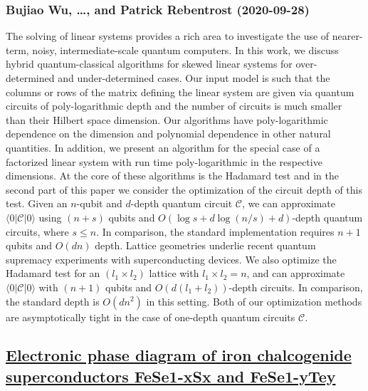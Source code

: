 \subsubsection*{Bujiao Wu, \dots, and Patrick Rebentrost (2020-09-28)}
The solving of linear systems provides a rich area to investigate the use of
nearer-term, noisy, intermediate-scale quantum computers. In this work, we
discuss hybrid quantum-classical algorithms for skewed linear systems for
over-determined and under-determined cases. Our input model is such that the
columns or rows of the matrix defining the linear system are given via quantum
circuits of poly-logarithmic depth and the number of circuits is much smaller
than their Hilbert space dimension. Our algorithms have poly-logarithmic
dependence on the dimension and polynomial dependence in other natural
quantities. In addition, we present an algorithm for the special case of a
factorized linear system with run time poly-logarithmic in the respective
dimensions. At the core of these algorithms is the Hadamard test and in the
second part of this paper we consider the optimization of the circuit depth of
this test. Given an $n$-qubit and $d$-depth quantum circuit $\mathcal{C}$, we
can approximate $\langle 0|\mathcal{C}|0\rangle$ using $(n + s)$ qubits and
$O\left(\log s + d\log (n/s) + d\right)$-depth quantum circuits, where $s\leq
n$. In comparison, the standard implementation requires $n+1$ qubits and
$O(dn)$ depth. Lattice geometries underlie recent quantum supremacy experiments
with superconducting devices. We also optimize the Hadamard test for an
$(l_1\times l_2)$ lattice with $l_1 \times l_2 = n$, and can approximate
$\langle 0|\mathcal{C} |0\rangle$ with $(n + 1)$ qubits and $O\left(d \left(l_1
+ l_2\right)\right)$-depth circuits. In comparison, the standard depth is
$O\left(d n^2\right)$ in this setting. Both of our optimization methods are
asymptotically tight in the case of one-depth quantum circuits $\mathcal{C}$.

\subsection*{\href{http://arxiv.org/abs/2009.13286v1}{Electronic phase diagram of iron chalcogenide superconductors FeSe1-xSx  and FeSe1-yTey}}
